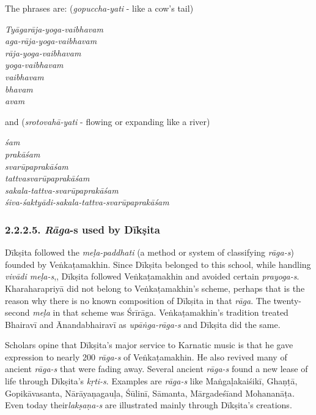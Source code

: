 The phrases are: (\textit{gopuccha-yati} - like a cow’s tail)

\begin{myquote}
\textit{Tyāgarāja-yoga-vaibhavam}\\ \textit{aga-rāja-yoga-vaibhavam}\\ \textit{rāja-yoga-vaibhavam}\\ \textit{yoga-vaibhavam}\\ \textit{vaibhavam}\\ \textit{bhavam}\\ \textit{avam}
\end{myquote}

and (\textit{srotovahā-yati} - flowing or expanding like a river)

\begin{myquote}
\textit{śam}\\ \textit{prakāśam}\\ \textit{svarūpaprakāśam}\\ \textit{tattvasvarūpaprakāśam}\\ \textit{sakala-tattva-svarūpaprakāśam}\\ \textit{śiva-śaktyādi-sakala-tattva-svarūpaprakāśam}
\end{myquote}

\vspace{-.4cm}

\subsubsection*{2.2.2.5. \textit{Rāga}-s used by Dīkṣita}

Dīkṣita followed the \textit{meḷa-paddhati} (a method or system of classifying \textit{rāga-s}) founded by Veṅkaṭamakhin. Since Dīkṣita belonged to this school, while handling \textit{vivādi meḷa-s},, Dīkṣita followed Veṅkaṭamakhin and avoided certain \textit{prayoga-s}. Kharaharapriyā did not belong to Veṅkaṭamakhin’s scheme, perhaps that is the reason why there is no known composition of Dīkṣita in that \textit{rāga}. The twenty-second \textit{meḷa} in that scheme was Śrīrāga. Veṅkaṭamakhin’s tradition treated Bhairavī and Ānandabhairavī as \textit{upāṅga-rāga-s} and Dīkṣita did the same.

Scholars opine that Dīkṣita’s major service to Karnatic music is that he gave expression to nearly 200 \textit{rāga-s} of Veṅkaṭamakhin. He also revived many of ancient \textit{rāga-s} that were fading away. Several ancient \textit{rāga-s} found a new lease of life through Dīkṣita’s \textit{kṛti-s}. Examples are \textit{rāga-s} like Maṅgaḷakaiśikī, Ghaṇṭā, Gopikāvasanta, Nārāyaṇagauḷa, Śūlinī, Sāmanta, Mārgadeśīand Mohananāṭa\textit{. }Even today their\break \textit{lakṣaṇa-s} are illustrated mainly through Dīkṣita’s creations.

